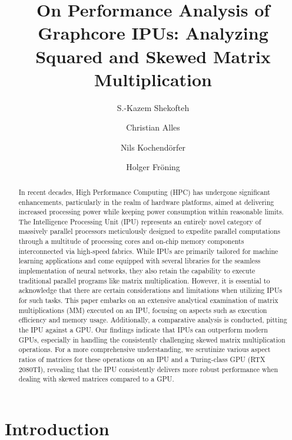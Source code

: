 \documentclass[a4paper,UKenglish,cleveref, autoref, thm-restate]{oasics-v2021}
\title{On Performance Analysis of Graphcore IPUs: Analyzing Squared and Skewed Matrix Multiplication}%
\author{S.-Kazem Shekofteh}{Institute of Computer Engineering, Heidelberg University, Germany}{kazem.shekofteh@ziti.uni-heidelberg.de}{https://orcid.org/0000-0002-8783-6243}{}
\author{Christian Alles}{Institute of Computer Engineering, Heidelberg University, Germany}{christian.alles@stud.uni-heidelberg.de}{[orcid]}{}
\author{Nils Kochendörfer}{Institute of Computer Engineering, Heidelberg University, Germany}{nils.kochendoerfer@stud.uni-heidelberg.de}{[orcid]}{}
\author{Holger Fröning}{Institute of Computer Engineering, Heidelberg University, Germany}{holger.froening@ziti.uni-heidelberg.de}{https://orcid.org/0000-0001-9562-0680}{}
\begin{document}
\maketitle

\begin{abstract}
In recent decades, High Performance Computing (HPC) has undergone significant enhancements, particularly in the realm of hardware platforms, aimed at delivering increased processing power while keeping power consumption within reasonable limits.
The Intelligence Processing Unit (IPU) represents an entirely novel category of massively parallel processors meticulously designed to expedite parallel computations through a multitude of processing cores and on-chip memory components interconnected via high-speed fabrics. While IPUs are primarily tailored for machine learning applications and come equipped with several libraries for the seamless implementation of neural networks, they also retain the capability to execute traditional parallel programs like matrix multiplication. However, it is essential to acknowledge that there are certain considerations and limitations when utilizing IPUs for such tasks.
This paper embarks on an extensive analytical examination of matrix multiplications (MM) executed on an IPU, focusing on aspects such as execution efficiency and memory usage. Additionally, a comparative analysis is conducted, pitting the IPU against a GPU. Our findings indicate that IPUs can outperform modern GPUs, especially in handling the consistently challenging skewed matrix multiplication operations. For a more comprehensive understanding, we scrutinize various aspect ratios of matrices for these operations on an IPU and a Turing-class GPU (RTX 2080TI), revealing that the IPU consistently delivers more robust performance when dealing with skewed matrices compared to a GPU.
\end{abstract}


\section{Introduction}
\label{sec:typesetting-summary}
\end{document}
